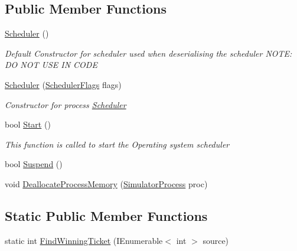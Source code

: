 \subsection*{Public Member Functions}
\begin{DoxyCompactItemize}
\item 
\hyperlink{class_c_p_u___o_s___simulator_1_1_operating___system_1_1_scheduler_a5911adf7a88d4bc66f0de915bb925461}{Scheduler} ()
\begin{DoxyCompactList}\small\item\em Default Constructor for scheduler used when deserialising the scheduler N\+O\+T\+E\+: D\+O N\+O\+T U\+S\+E I\+N C\+O\+D\+E \end{DoxyCompactList}\item 
\hyperlink{class_c_p_u___o_s___simulator_1_1_operating___system_1_1_scheduler_a686c31e6925c34fa366b0dfee0881950}{Scheduler} (\hyperlink{struct_c_p_u___o_s___simulator_1_1_operating___system_1_1_scheduler_flags}{Scheduler\+Flags} flags)
\begin{DoxyCompactList}\small\item\em Constructor for process \hyperlink{class_c_p_u___o_s___simulator_1_1_operating___system_1_1_scheduler}{Scheduler} \end{DoxyCompactList}\item 
bool \hyperlink{class_c_p_u___o_s___simulator_1_1_operating___system_1_1_scheduler_a0c5d3add7cf99eeb8c58c0a009ba6741}{Start} ()
\begin{DoxyCompactList}\small\item\em This function is called to start the Operating system scheduler \end{DoxyCompactList}\item 
bool \hyperlink{class_c_p_u___o_s___simulator_1_1_operating___system_1_1_scheduler_a04a41549a076bbea4eb705e3118df52b}{Suspend} ()
\item 
void \hyperlink{class_c_p_u___o_s___simulator_1_1_operating___system_1_1_scheduler_a72857ea251d167fb0a65452ef80e8796}{Deallocate\+Process\+Memory} (\hyperlink{class_c_p_u___o_s___simulator_1_1_operating___system_1_1_simulator_process}{Simulator\+Process} proc)
\end{DoxyCompactItemize}
\subsection*{Static Public Member Functions}
\begin{DoxyCompactItemize}
\item 
static int \hyperlink{class_c_p_u___o_s___simulator_1_1_operating___system_1_1_scheduler_a652b744d35a335b5e834ea25c1df00e5}{Find\+Winning\+Ticket} (I\+Enumerable$<$ int $>$ source)
\end{DoxyCompactItemize}
